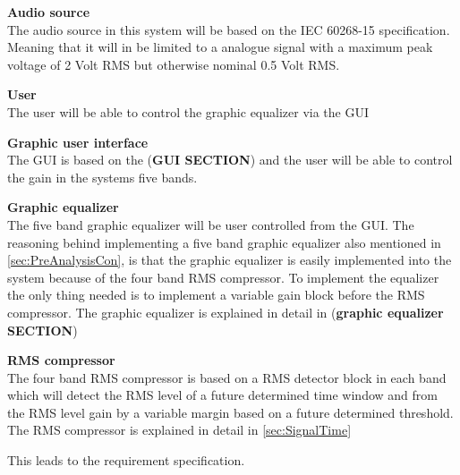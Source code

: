 \textbf{Audio source} \\
The audio source in this system will be based on the IEC 60268-15 specification. Meaning that it will in be limited to a analogue signal with a maximum peak voltage of 2 Volt RMS but otherwise nominal 0.5 Volt RMS. %

\textbf{User} \\
The user will be able to control the graphic equalizer via the GUI 

\textbf{Graphic user interface}\\
The GUI is based on the (\textbf{GUI SECTION}) and the user will be able to control the gain in the systems five bands.

\textbf{Graphic equalizer}\\
The five band graphic equalizer will be user controlled from the GUI. The reasoning behind implementing a five band graphic equalizer also mentioned in \autoref{sec:PreAnalysisCon}, is that the graphic equalizer is easily implemented into the system because of the four band RMS compressor. To implement the equalizer the only thing needed is to implement a variable gain block before the RMS compressor. The graphic equalizer is explained in detail in (\textbf{graphic equalizer SECTION}) 

\textbf{RMS compressor}\\
The four band RMS compressor is based on a RMS detector block in each band which will detect the RMS level of a future determined time window and from the RMS level gain by a variable margin based on a future determined threshold. The RMS compressor is explained in detail in \autoref{sec:SignalTime}  

This leads to the requirement specification. 


